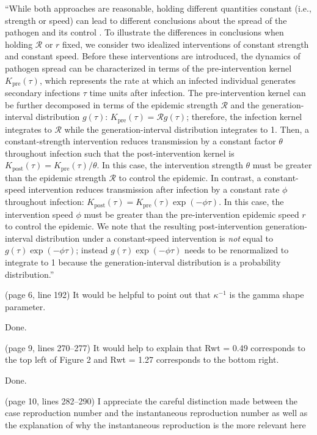 \documentclass[12pt]{article}
\newcommand{\RR}{\ensuremath{{\mathcal R}}\xspace}
\newcommand{\revtext}{\textsf}
\begin{document}
``While both approaches are reasonable, holding different quantities constant (i.e., strength or speed) can lead to different conclusions about the spread of the pathogen and its control \citep{doi:10.1098/rspb.2020.1556}.
To illustrate the differences in conclusions when holding $\RR$ or $r$ fixed, we consider two idealized interventions of constant strength and constant speed.
Before these interventions are introduced, the dynamics of pathogen spread can be characterized in terms of the pre-intervention kernel $K_{\mathrm{pre}}(\tau)$, which represents the rate at which an infected individual generates secondary infections $\tau$ time units after infection.
The pre-intervention kernel can be further decomposed in terms of the epidemic strength $\RR$ and the generation-interval distribution $g(\tau)$: $K_{\mathrm{pre}}(\tau) = \RR g(\tau)$;
therefore, the infection kernel integrates to $\RR$ while the generation-interval distribution integrates to 1.
Then, a constant-strength intervention reduces transmission by a constant factor $\theta$ throughout infection such that the post-intervention kernel is $K_{\mathrm{post}}(\tau) = K_{\mathrm{pre}}(\tau)/\theta$.
In this case, the intervention strength $\theta$ must be greater than the epidemic strength $\RR$ to control the epidemic.
In contrast, a constant-speed intervention reduces transmission after infection by a constant rate $\phi$ throughout infection: $K_{\mathrm{post}}(\tau) = K_{\mathrm{pre}}(\tau) \exp(-\phi \tau)$.
In this case, the intervention speed $\phi$ must be greater than the pre-intervention epidemic speed $r$ to control the epidemic.
We note that the resulting post-intervention generation-interval distribution under a constant-speed intervention is \emph{not} equal to $g(\tau) \exp(-\phi \tau)$; instead $g(\tau) \exp(-\phi \tau)$ needs to be renormalized to integrate to 1 because the generation-interval distribution is a probability distribution.''

\revtext{(page 6, line 192) It would be helpful to point out that $\kappa^{-1}$ is the gamma shape parameter.}

Done.

\revtext{(page 9, lines 270–277) It would help to explain that Rwt = 0.49 corresponds to the top left of Figure 2 and Rwt = 1.27 corresponds to the bottom right.}

Done.

\revtext{(page 10, lines 282–290) I appreciate the careful distinction made between
the case reproduction number and the instantaneous reproduction number
as well as the explanation of why the instantaneous reproduction is the
more relevant here}
\end{document}
